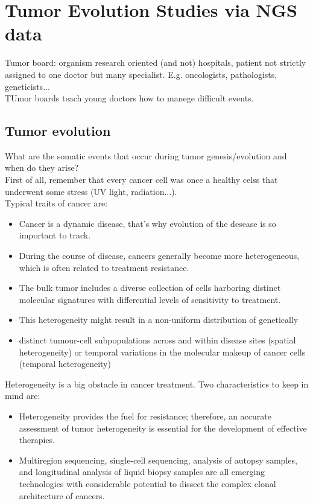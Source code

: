 \graphicspath{{chapters/04/}}

\chapter{Tumor Evolution Studies via NGS data}
Tumor board: organism research oriented (and not) hospitals, patient not strictly assigned to one doctor but many specialist. E.g. oncologists, pathologists, geneticists...
\\
TUmor boards teach young doctors how to manege difficult events.
\section{Tumor evolution}
What are the somatic events that occur during tumor genesis/evolution and when do they arise?\\
First of all, remember that every cancer cell was once a healthy celss that underwent some stress (UV light, radiation...).\\
Typical traits of cancer are:
\begin{itemize}
\item Cancer is a dynamic disease, that's why evolution of the desease is so important to track.
\item During the course of disease, cancers generally become more
heterogeneous, which is often related to treatment resistance.
\item The bulk tumor includes a diverse collection of cells harboring distinct molecular signatures with differential levels of sensitivity to treatment.
\item This heterogeneity might result in a non-uniform distribution of genetically
\item distinct tumour-cell subpopulations across and within disease sites (spatial heterogeneity) or temporal variations in the molecular makeup of cancer cells (temporal heterogeneity)
\end{itemize}

Heterogeneity is a big obstacle in cancer treatment. Two characteristics to keep in mind are:
\begin{itemize}
\item Heterogeneity provides the fuel for resistance; therefore, an accurate assessment of tumor heterogeneity is essential for the development of effective therapies.
\item Multiregion sequencing, single-cell sequencing, analysis of autopsy samples, and longitudinal analysis of liquid biopsy samples are all emerging technologies with considerable potential to dissect the complex clonal architecture of cancers. 
\end{itemize}

